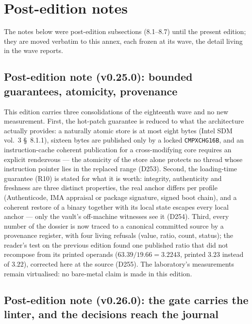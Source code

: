 \documentclass[10pt,a4paper]{article}
\begin{document}
\section{Post-edition notes}\label{sec:notes}
The notes below were post-edition subsections (8.1--8.7) until the
present edition; they are moved verbatim to this annex, each frozen at
its wave, the detail living in the wave reports.

\subsection{Post-edition note (v0.25.0): bounded guarantees, atomicity, provenance}

This edition carries three consolidations of the eighteenth wave and no new
measurement. First, the hot-patch guarantee is reduced to what the architecture
actually provides: a naturally atomic store is at most eight bytes (Intel SDM
vol.~3 \S~8.1.1), sixteen bytes are published only by a locked
\texttt{CMPXCHG16B}, and an instruction-cache coherent publication for a
cross-modifying core requires an explicit rendezvous --- the atomicity of the
store alone protects no thread whose instruction pointer lies in the replaced
range (D253). Second, the loading-time guarantee (R10) is stated for what it is
worth: integrity, authenticity and freshness are three distinct properties, the
real anchor differs per profile (Authenticode, IMA appraisal or package
signature, signed boot chain), and a coherent restore of a binary together with
its local state escapes every local anchor --- only the vault's off-machine
witnesses see it (D254). Third, every number of the dossier is now traced to a
canonical committed source by a provenance register, with four living refusals
(value, ratio, count, status); the reader's test on the previous edition found
one published ratio that did not recompose from its printed operands
($63.39/19.66 = 3.2243$, printed $3.23$ instead of $3.22$), corrected here at
the source (D255). The laboratory's measurements remain virtualised: no bare-metal
claim is made in this edition.


\subsection{Post-edition note (v0.26.0): the gate carries the linter, and the decisions reach the journal}
\end{document}
